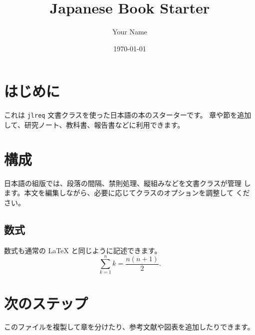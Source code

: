\documentclass[paper=a4,fontsize=11pt]{jlreq}
\title{Japanese Book Starter}
\author{Your Name}
\date{\today}
\begin{document}
\maketitle
\tableofcontents

\section{はじめに}
これは \texttt{jlreq} 文書クラスを使った日本語の本のスターターです。
章や節を追加して、研究ノート、教科書、報告書などに利用できます。

\section{構成}
日本語の組版では、段落の間隔、禁則処理、縦組みなどを文書クラスが管理
します。本文を編集しながら、必要に応じてクラスのオプションを調整して
ください。

\subsection{数式}
数式も通常の LaTeX と同じように記述できます。
\[
  \sum_{k=1}^{n} k = \frac{n(n+1)}{2}.
\]

\section{次のステップ}
このファイルを複製して章を分けたり、参考文献や図表を追加したりできます。
\end{document}
